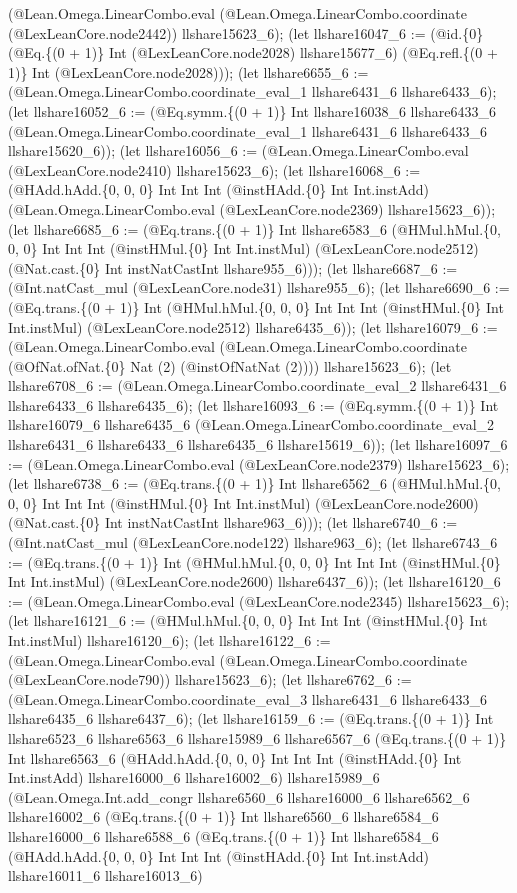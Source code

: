\documentclass[11pt]{article}
\begin{document}
(@Lean.Omega.LinearCombo.eval (@Lean.Omega.LinearCombo.coordinate (@LexLeanCore.node2442)) llshare15623\_6); (let llshare16047\_6 := (@id.\{0\} (@Eq.\{(0 + 1)\} Int (@LexLeanCore.node2028) llshare15677\_6) (@Eq.refl.\{(0 + 1)\} Int (@LexLeanCore.node2028))); (let llshare6655\_6 := (@Lean.Omega.LinearCombo.coordinate\_eval\_1 llshare6431\_6 llshare6433\_6); (let llshare16052\_6 := (@Eq.symm.\{(0 + 1)\} Int llshare16038\_6 llshare6433\_6 (@Lean.Omega.LinearCombo.coordinate\_eval\_1 llshare6431\_6 llshare6433\_6 llshare15620\_6)); (let llshare16056\_6 := (@Lean.Omega.LinearCombo.eval (@LexLeanCore.node2410) llshare15623\_6); (let llshare16068\_6 := (@HAdd.hAdd.\{0, 0, 0\} Int Int Int (@instHAdd.\{0\} Int Int.instAdd) (@Lean.Omega.LinearCombo.eval (@LexLeanCore.node2369) llshare15623\_6)); (let llshare6685\_6 := (@Eq.trans.\{(0 + 1)\} Int llshare6583\_6 (@HMul.hMul.\{0, 0, 0\} Int Int Int (@instHMul.\{0\} Int Int.instMul) (@LexLeanCore.node2512) (@Nat.cast.\{0\} Int instNatCastInt llshare955\_6))); (let llshare6687\_6 := (@Int.natCast\_mul (@LexLeanCore.node31) llshare955\_6); (let llshare6690\_6 := (@Eq.trans.\{(0 + 1)\} Int (@HMul.hMul.\{0, 0, 0\} Int Int Int (@instHMul.\{0\} Int Int.instMul) (@LexLeanCore.node2512) llshare6435\_6)); (let llshare16079\_6 := (@Lean.Omega.LinearCombo.eval (@Lean.Omega.LinearCombo.coordinate (@OfNat.ofNat.\{0\} Nat (2) (@instOfNatNat (2)))) llshare15623\_6); (let llshare6708\_6 := (@Lean.Omega.LinearCombo.coordinate\_eval\_2 llshare6431\_6 llshare6433\_6 llshare6435\_6); (let llshare16093\_6 := (@Eq.symm.\{(0 + 1)\} Int llshare16079\_6 llshare6435\_6 (@Lean.Omega.LinearCombo.coordinate\_eval\_2 llshare6431\_6 llshare6433\_6 llshare6435\_6 llshare15619\_6)); (let llshare16097\_6 := (@Lean.Omega.LinearCombo.eval (@LexLeanCore.node2379) llshare15623\_6); (let llshare6738\_6 := (@Eq.trans.\{(0 + 1)\} Int llshare6562\_6 (@HMul.hMul.\{0, 0, 0\} Int Int Int (@instHMul.\{0\} Int Int.instMul) (@LexLeanCore.node2600) (@Nat.cast.\{0\} Int instNatCastInt llshare963\_6))); (let llshare6740\_6 := (@Int.natCast\_mul (@LexLeanCore.node122) llshare963\_6); (let llshare6743\_6 := (@Eq.trans.\{(0 + 1)\} Int (@HMul.hMul.\{0, 0, 0\} Int Int Int (@instHMul.\{0\} Int Int.instMul) (@LexLeanCore.node2600) llshare6437\_6)); (let llshare16120\_6 := (@Lean.Omega.LinearCombo.eval (@LexLeanCore.node2345) llshare15623\_6); (let llshare16121\_6 := (@HMul.hMul.\{0, 0, 0\} Int Int Int (@instHMul.\{0\} Int Int.instMul) llshare16120\_6); (let llshare16122\_6 := (@Lean.Omega.LinearCombo.eval (@Lean.Omega.LinearCombo.coordinate (@LexLeanCore.node790)) llshare15623\_6); (let llshare6762\_6 := (@Lean.Omega.LinearCombo.coordinate\_eval\_3 llshare6431\_6 llshare6433\_6 llshare6435\_6 llshare6437\_6); (let llshare16159\_6 := (@Eq.trans.\{(0 + 1)\} Int llshare6523\_6 llshare6563\_6 llshare15989\_6 llshare6567\_6 (@Eq.trans.\{(0 + 1)\} Int llshare6563\_6 (@HAdd.hAdd.\{0, 0, 0\} Int Int Int (@instHAdd.\{0\} Int Int.instAdd) llshare16000\_6 llshare16002\_6) llshare15989\_6 (@Lean.Omega.Int.add\_congr llshare6560\_6 llshare16000\_6 llshare6562\_6 llshare16002\_6 (@Eq.trans.\{(0 + 1)\} Int llshare6560\_6 llshare6584\_6 llshare16000\_6 llshare6588\_6 (@Eq.trans.\{(0 + 1)\} Int llshare6584\_6 (@HAdd.hAdd.\{0, 0, 0\} Int Int Int (@instHAdd.\{0\} Int Int.instAdd) llshare16011\_6 llshare16013\_6) 
\end{document}
